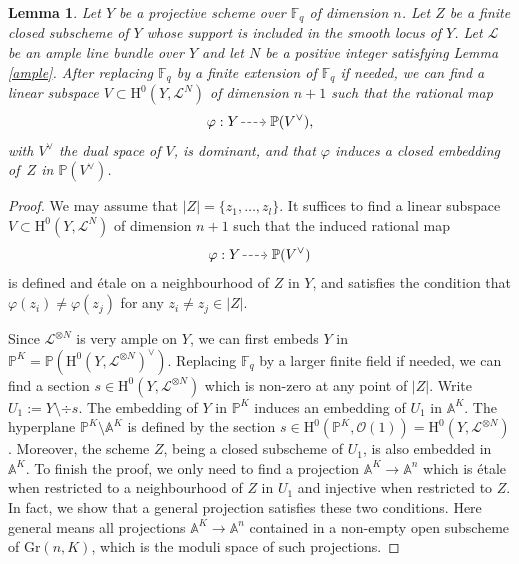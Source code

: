 \documentclass[JEP,XML,SOM,Unicode,published]{cedram}
\newcommand{\dradpl}{{\hspace*{-2.5mm}\begin{tikzcd}[ampersand replacement=\&,column sep = scriptsize]\mbox{}\ar[r,dashed]\&\mbox{}\end{tikzcd}\hspace*{-2mm}}}
\newcommand{\dratst}{{\hspace*{-2.5mm}\begin{tikzcd}[ampersand replacement=\&,column sep = small]\mbox{}\ar[r,dashed]\&\mbox{}\end{tikzcd}\hspace*{-2mm}}}
\let\drascst\dratst
\newcommand{\dra}{\mathchoice{\dradpl}{\dratst}{\drascst}{\drascst}}
\theoremstyle{plain}
\newtheorem{lem}[thm]{Lemma}
\theoremstyle{definition}
\newcommand{\ho}{\mathrm{H}}
\newcommand{\li}{\mathcal{L}}
\newcommand{\A}{\mathbb{A}}
\newcommand{\pr}{\mathbb{P}}
\newcommand{\F}{\mathbb{F}}
\begin{document}
\begin{lem}
Let $Y$ be a projective scheme over $\F_q$ of dimension $n$. Let $Z$ be a finite closed subscheme of $Y$ whose support is included in the smooth locus of $Y$. Let $\li$ be an ample line bundle over $Y$ and let $N$ be a positive integer satisfying Lemma \ref{ample}. After replacing $\F_q$ by a finite extension of $\F_q$ if needed, we can find a linear subspace $V\subset \ho^0(Y, \li^{N})$ of dimension $n+1$ such that the rational map\vspace*{-3pt}
\[
\varphi: Y \dra \pr(V^{\vee}),
\]
with $V^{\vee}$ the dual space of $V$, is dominant, and that $\varphi$ induces a closed embedding of~$Z$ in $\pr(V^{\vee})$.
\end{lem}
\begin{proof}
We may assume that $|Z|=\{ z_1,\dots, z_l \}$. It suffices to find a linear subspace $V\subset \ho^0(Y, \li^{N})$ of dimension $n+1$ such that the induced rational map
\[
\varphi: Y \dra \pr(V^{\vee})
\]
is defined and étale on a neighbourhood of $Z$ in $Y$, and satisfies the condition that $\varphi(z_i)\not=\varphi(z_j)$ for any $z_i\not=z_j\in |Z|$.

Since $\li^{\otimes N}$ is very ample on $Y$, we can first embeds $Y$ in $\pr^K=\pr(\ho^0(Y, \li^{\otimes N})^{\vee})$. Replacing $\F_q$ by a larger finite field if needed, we can find a section $s\in \ho^0(Y, \li^{\otimes N})$ which is non-zero at any point of $|Z|$. Write $U_1:=Y\setminus\div s$. The embedding of $Y$ in $\pr^K$ induces an embedding of $U_1$ in $\A^{\!K}$. The hyperplane $\pr^K\setminus\A^{\!K}$ is defined by the section $s\in \ho^0(\pr^K, \mathcal{O}(1))=\ho^0(Y, \li^{\otimes N})$. Moreover, the scheme $Z$, being a closed subscheme of $U_1$, is also embedded in $\A^{\!K}$. To finish the proof, we only need to find a projection $\A^{\!K}\to \A^n$ which is étale when restricted to a neighbourhood of $Z$ in $U_1$ and injective when restricted to $Z$. In fact, we show that a general projection satisfies these two conditions. Here general means all projections $\A^{\!K}\to \A^n$ contained in a non-empty open subscheme of $\mathrm{Gr}(n, K)$, which is the moduli space of such projections.


\end{proof}
\end{document}

